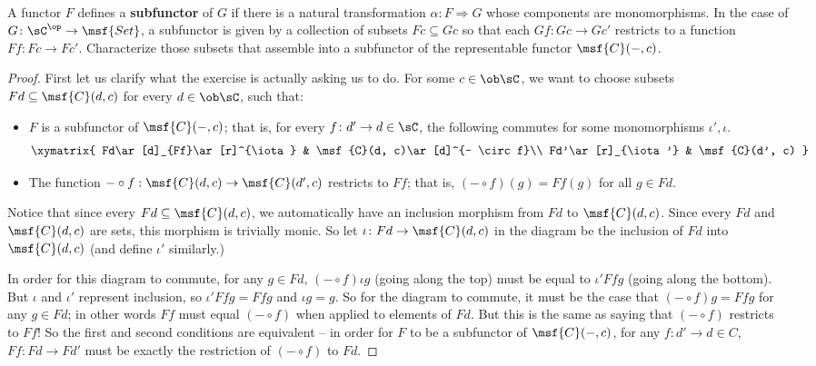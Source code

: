 \documentclass[main,tex]{subfiles}
\begin{document}
\paragraph{}
	\begin{exercise}
		 A functor \(F\) defines a \textbf{subfunctor} of \(G\) if there is a 
		 natural transformation \(\alpha \colon F \Rightarrow G \) whose 
		 components are monomorphisms. In the case of \(G \colon \sC^{\op} \to 
		 \msf{Set}\), a subfunctor is given by a collection of subsets \(Fc 
		 \subseteq Gc\) so that each \(Gf \colon Gc \to Gc'\) restricts to a 
		 function \(Ff \colon Fc \to Fc'\). Characterize those subsets that 
		 assemble into a subfunctor of the representable functor 
		 \(\msf{C}(-,c)\).
	\end{exercise}
	\begin{proof}
		First let us clarify what the exercise is actually 
		asking us to do. For some \(c \in \ob\sC\), we want to choose subsets 
		\(Fd \subseteq \msf{C}(d,c)\) for every \(d \in \ob\sC\), such that:
		\begin{itemize}
			\item \(F\) is a subfunctor of \(\msf{C}(-,c)\); that is, for every \(f \colon d' \to d \in \sC\), the following commutes for some monomorphisms \(\iota', \iota\).
			$$
			\xymatrix{
			 Fd\ar[d]_{Ff}\ar[r]^{\iota} & \msf{C}(d, c)\ar[d]^{- \circ f}\\
			Fd'\ar[r]_{\iota'} & \msf{C}(d', c)
			}
			$$
			\item The function \(- \circ f: \msf{C}(d, c) \to \msf{C}(d', c)\) restricts to \(Ff\); that is, \((- \circ f)(g) = Ff(g)\) for all \(g \in Fd\).
			
		\end{itemize}
		Notice that since every \(Fd \subseteq \msf{C}(d,c)\), we automatically 
		have an inclusion morphism from \(Fd\) to \(\msf{C}(d,c)\). Since every 
		\(Fd\) and \(\msf{C}(d,c)\) are sets, this morphism is trivially monic. 
		So let \(\iota \colon Fd \to \msf{C}(d,c)\) in the diagram be the 
		inclusion of \(Fd\) into \(\msf{C}(d,c)\) (and define \(\iota'\) 
		similarly.)		
		
		In order for this diagram to commute, for any \(g \in Fd\), \((- \circ 
		f)\iota g\) (going along the top) must be equal to \(\iota'Ffg\) (going 
		along the bottom). But \(\iota\) and \(\iota'\) represent inclusion, so 
		\(\iota' Ffg = Ffg\) and \(\iota g = g\). So for the diagram to 
		commute, it must be the case that \((- \circ f)g = Ffg\) for any \(g 
		\in Fd\); in other words \(Ff\) must equal \((- \circ f)\) when applied 
		to elements of \(Fd\). But this is the same as saying that \((- \circ 
		f)\) restricts to \(Ff\)! So the first and second conditions are 
		equivalent -- in order for \(F\) to be a subfunctor of 
		\(\msf{C}(-,c)\), for any \(f \colon d' \to d \in C\), \(Ff \colon Fd 
		\to Fd'\) must be exactly the restriction of \((- \circ f)\) to \(Fd\). 
		

\end{proof}
\end{document}
